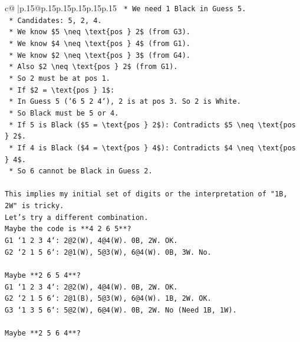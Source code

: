 \documentclass{article}
\begin{document}
{\begin{supertabular}{c@{$\;$}|p{.15\linewidth}@{}p{.15\linewidth}p{.15\linewidth}p{.15\linewidth}p{.15\linewidth}p{.15\linewidth}}
{{{\texttt{    *   We need 1 Black in Guess 5.} \\
\texttt{    *   Candidates: 5, 2, 4.} \\
\texttt{    *   We know \$5 \textbackslash{}neq \textbackslash{}text\{pos \} 2\$ (from G3).} \\
\texttt{    *   We know \$4 \textbackslash{}neq \textbackslash{}text\{pos \} 4\$ (from G1).} \\
\texttt{    *   We know \$2 \textbackslash{}neq \textbackslash{}text\{pos \} 3\$ (from G4).} \\
\texttt{    *   Also \$2 \textbackslash{}neq \textbackslash{}text\{pos \} 2\$ (from G1).} \\
\texttt{    *   So 2 must be at pos 1.} \\
\texttt{    *   If \$2 = \textbackslash{}text\{pos \} 1\$:} \\
\texttt{        *   In Guess 5 (`6 5 2 4`), 2 is at pos 3. So 2 is White.} \\
\texttt{        *   So Black must be 5 or 4.} \\
\texttt{        *   If 5 is Black (\$5 = \textbackslash{}text\{pos \} 2\$): Contradicts \$5 \textbackslash{}neq \textbackslash{}text\{pos \} 2\$.} \\
\texttt{        *   If 4 is Black (\$4 = \textbackslash{}text\{pos \} 4\$): Contradicts \$4 \textbackslash{}neq \textbackslash{}text\{pos \} 4\$.} \\
\texttt{    *   So 6 cannot be Black in Guess 2.} \\
\\ 
\texttt{This implies my initial set of digits or the interpretation of "1B, 2W" is tricky.} \\
\texttt{Let's try a different combination.} \\
\texttt{Maybe the code is **4 2 6 5**?} \\
\texttt{G1 `1 2 3 4`: 2@2(W), 4@4(W). 0B, 2W. OK.} \\
\texttt{G2 `2 1 5 6`: 2@1(W), 5@3(W), 6@4(W). 0B, 3W. No.} \\
\\ 
\texttt{Maybe **2 6 5 4**?} \\
\texttt{G1 `1 2 3 4`: 2@2(W), 4@4(W). 0B, 2W. OK.} \\
\texttt{G2 `2 1 5 6`: 2@1(B), 5@3(W), 6@4(W). 1B, 2W. OK.} \\
\texttt{G3 `1 3 5 6`: 5@2(W), 6@4(W). 0B, 2W. No (Need 1B, 1W).} \\
\\ 
\texttt{Maybe **2 5 6 4**?} \\
}}}
\end{supertabular}}
\end{document}
